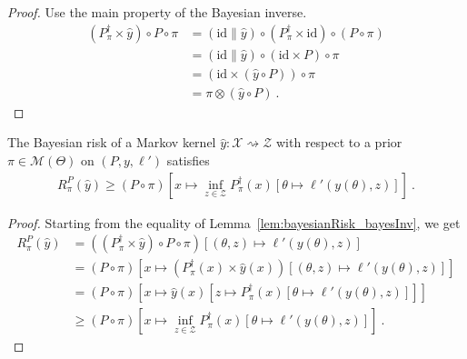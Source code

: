 \begin{proof}\mathlibok
{}
Use the main property of the Bayesian inverse.
\begin{align*}
  (P_\pi^\dagger \times \hat{y}) \circ P \circ \pi
  &= (\mathrm{id} \parallel \hat{y}) \circ (P_\pi^\dagger \times \mathrm{id}) \circ (P \circ \pi)
  \\
  &= (\mathrm{id} \parallel \hat{y}) \circ (\mathrm{id} \times P) \circ \pi
  \\
  &= (\mathrm{id} \times (\hat{y} \circ P)) \circ \pi
  \\
  &= \pi \otimes (\hat{y} \circ P)
  \: .
  \end{align*}
\end{proof}

\begin{lemma}
  \label{lem:bayesianRisk_ge_inf_bayesInv}
  \mathlibok
  The Bayesian risk of a Markov kernel $\hat{y} : \mathcal X \rightsquigarrow \mathcal Z$ with respect to a prior $\pi \in \mathcal M(\Theta)$ on $(P, y, \ell')$ satisfies
  \begin{align*}
  R^P_\pi(\hat{y}) \ge (P \circ \pi)\left[x \mapsto \inf_{z \in \mathcal Z} P_\pi^\dagger(x) \left[\theta \mapsto \ell'(y(\theta), z)\right]\right] \: .
  \end{align*}
\end{lemma}

\begin{proof}\mathlibok
{}
Starting from the equality of Lemma~\ref{lem:bayesianRisk_bayesInv}, we get
\begin{align*}
R^P_\pi(\hat{y})
&= ((P_\pi^\dagger \times \hat{y}) \circ P \circ \pi)\left[(\theta, z) \mapsto \ell'(y(\theta), z)\right]
\\
&= (P \circ \pi)\left[x \mapsto (P_\pi^\dagger(x) \times \hat{y}(x)) \left[(\theta, z) \mapsto \ell'(y(\theta), z)\right]\right]
\\
&= (P \circ \pi)\left[x \mapsto \hat{y}(x)\left[z \mapsto P_\pi^\dagger(x) \left[\theta \mapsto \ell'(y(\theta), z)\right]\right]\right]
\\
&\ge (P \circ \pi)\left[x \mapsto \inf_{z \in \mathcal Z} P_\pi^\dagger(x) \left[\theta \mapsto \ell'(y(\theta), z)\right]\right]
\: .
\end{align*}

\end{proof}

